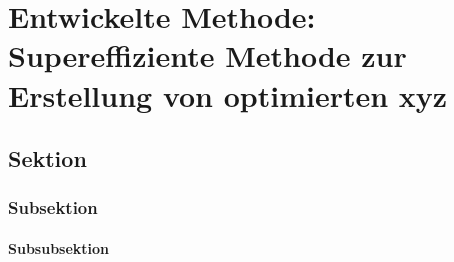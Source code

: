 \chapter{Entwickelte Methode: Supereffiziente Methode zur Erstellung von optimierten xyz}
\label{ch:EntwickelteMethode}





\section{Sektion}
\lipsum[1]




\subsection{Subsektion}
\lipsum[1]



\subsubsection{Subsubsektion}
\lipsum[1-5]







